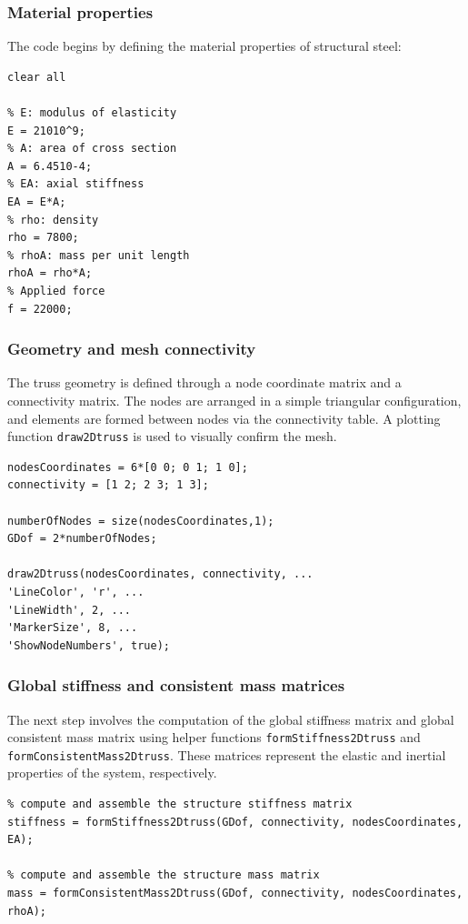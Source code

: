 \documentclass[12pt]{article}
\begin{document}
\subsubsection*{Material properties}
The code begins by defining the material properties of structural steel:

\begin{verbatim}
clear all

% E: modulus of elasticity
E = 21010^9;
% A: area of cross section
A = 6.4510-4;
% EA: axial stiffness
EA = E*A;
% rho: density
rho = 7800;
% rhoA: mass per unit length
rhoA = rho*A;
% Applied force
f = 22000;
\end{verbatim}

\subsubsection*{Geometry and mesh connectivity}
The truss geometry is defined through a node coordinate matrix and a connectivity matrix. The nodes are arranged in a simple triangular configuration, and elements are formed between nodes via the connectivity table. A plotting function \texttt{draw2Dtruss} is used to visually confirm the mesh.

\begin{verbatim}
nodesCoordinates = 6*[0 0; 0 1; 1 0];
connectivity = [1 2; 2 3; 1 3];

numberOfNodes = size(nodesCoordinates,1);
GDof = 2*numberOfNodes;

draw2Dtruss(nodesCoordinates, connectivity, ...
'LineColor', 'r', ...
'LineWidth', 2, ...
'MarkerSize', 8, ...
'ShowNodeNumbers', true);
\end{verbatim}

\subsubsection*{Global stiffness and consistent mass matrices}
The next step involves the computation of the global stiffness matrix and global consistent mass matrix using helper functions \texttt{formStiffness2Dtruss} and \texttt{formConsistentMass2Dtruss}. These matrices represent the elastic and inertial properties of the system, respectively.

\begin{verbatim}
% compute and assemble the structure stiffness matrix
stiffness = formStiffness2Dtruss(GDof, connectivity, nodesCoordinates, EA);

% compute and assemble the structure mass matrix
mass = formConsistentMass2Dtruss(GDof, connectivity, nodesCoordinates, rhoA);
\end{verbatim}
\end{document}
